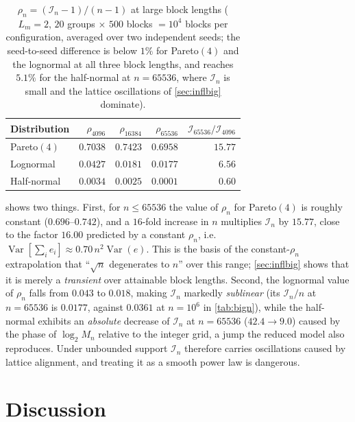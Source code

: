 \documentclass[twocolumn,review,hidelinks,oneeqnum,onetabnum,onefignum,onethmnum]{siamart251216}
\begin{document}
\begin{table}[!tb]
\centering
\caption{$\rho_n=(\mathcal I_n-1)/(n-1)$ at large block lengths ($L_m=2$,
$20$ groups $\times$ $500$ blocks $=10^4$ blocks per configuration, averaged over
two independent seeds; the seed-to-seed difference is below $1\%$ for Pareto$(4)$
and the lognormal at all three block lengths, and reaches $5.1\%$ for the
half-normal at $n=65536$, where $\mathcal I_n$ is small and the lattice
oscillations of \cref{sec:inflbig} dominate).}
\label{tab:largen}
\footnotesize
\begin{tabular}{@{}lrrrr@{}}
\toprule
Distribution & $\rho_{4096}$ & $\rho_{16384}$ & $\rho_{65536}$ & $\mathcal I_{65536}/\mathcal I_{4096}$ \\
\midrule
Pareto$(4)$ & $0.7038$ & $0.7423$ & $0.6958$ & $\mathbf{15.77}$ \\
Lognormal   & $0.0427$ & $0.0181$ & $0.0177$ & $6.56$ \\
Half-normal & $0.0034$ & $0.0025$ & $0.0001$ & $0.60$ \\
\bottomrule
\end{tabular}
\end{table}

 shows two things. First, for $n\le65536$ the value of $\rho_n$
for Pareto$(4)$ is roughly constant ($0.696$--$0.742$), and a $16$-fold increase
in $n$ multiplies $\mathcal I_n$ by $15.77$, close to the factor $16.00$ predicted
by a constant $\rho_n$, i.e.
$\operatorname{Var}[\sum_ie_i]\approx0.70\,n^2\operatorname{Var}(e)$. This is the
basis of the constant-$\rho_n$ extrapolation that ``$\sqrt n$ degenerates to $n$''
over this range; \cref{sec:inflbig} shows that it is merely a \emph{transient}
over attainable block lengths. Second, the lognormal value of $\rho_n$ falls from
$0.043$ to $0.018$, making $\mathcal I_n$ markedly \emph{sublinear} (its
$\mathcal I_n/n$ at $n=65536$ is $0.0177$, against $0.0361$ at $n=10^6$ in
\cref{tab:bign}), while the half-normal exhibits an \emph{absolute} decrease of
$\mathcal I_n$ at $n=65536$ ($42.4\to9.0$) caused by the phase of $\log_2M_n$
relative to the integer grid, a jump the reduced model also reproduces. Under
unbounded support $\mathcal I_n$ therefore carries oscillations caused by lattice
alignment, and treating it as a smooth power law is dangerous.

\section{Discussion}
\label{sec:discussion}
\end{document}
